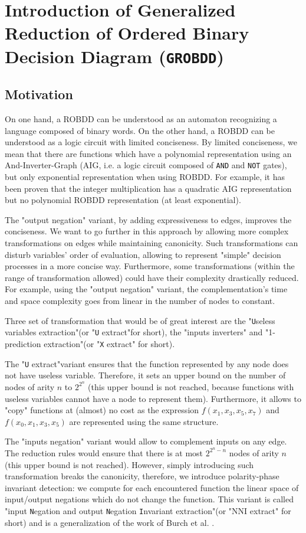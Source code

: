 \documentclass[a4paper,10pt]{article}
\newcommand{\Uextract}{"\texttt{U}seless variables extraction"}
\newcommand{\uextract}{"\texttt{U} extract"}
\newcommand{\NNIextract}{"input \texttt{N}egation and output \texttt{N}egation \texttt{I}nvariant extraction"}
\newcommand{\Xextract}{"1-prediction extraction"}
\newcommand{\GroBdd}{\texttt{GROBDD}}
\begin{document}
\section{Introduction of Generalized Reduction of Ordered Binary Decision Diagram (\GroBdd{})}

\subsection{Motivation}

On one hand, a ROBDD can be understood as an automaton recognizing a language composed of binary words.
On the other hand, a ROBDD can be understood as a logic circuit with limited conciseness.
By limited conciseness, we mean that there are functions which have a polynomial representation using an And-Inverter-Graph (AIG, i.e. a logic circuit composed of \texttt{AND} and \texttt{NOT} gates), but only exponential representation when using ROBDD.
For example, it has been proven \cite{Bryant1986} that the integer multiplication has a quadratic AIG representation but no polynomial ROBDD representation (at least exponential).

The "output negation" variant, by adding expressiveness to edges, improves the conciseness.
We want to go further in this approach by allowing more complex transformations on edges while maintaining canonicity.
Such transformations can disturb variables' order of evaluation, allowing to represent "simple" decision processes in a more concise way.
Furthermore, some transformations (within the range of transformation allowed) could have their complexity drastically reduced.
For example, using the "output negation" variant, the complementation's time and space complexity goes from linear in the number of nodes to constant.

Three set of transformation that would be of great interest are the \Uextract (or \uextract for short), the "inputs inverters" and \Xextract (or "\texttt{X} extract" for short).


The \uextract variant ensures that the function represented by any node does not have useless variable.
Therefore, it sets an upper bound on the number of nodes of arity $n$ to $2^{2^n}$ (this upper bound is not reached, because functions with useless variables cannot have a node to represent them).
Furthermore, it allows to "copy" functions at (almost) no cost as the expression $f(x_1, x_3, x_5, x_7)$ and $f(x_0, x_1, x_3, x_5)$ are represented using the same structure.


The "inputs negation" variant would allow to complement inputs on any edge.
The reduction rules would ensure that there is at most $2^{2^n-n}$ nodes of arity $n$ (this upper bound is not reached).
However, simply introducing such transformation breaks the canonicity, therefore, we introduce polarity-phase invariant detection: we compute for each encountered function the linear space of input/output negations which do not change the function.
This variant is called \NNIextract (or "NNI extract" for short) and is a generalization of the work of Burch et al. \cite{BurchLong1992}.
\end{document}
